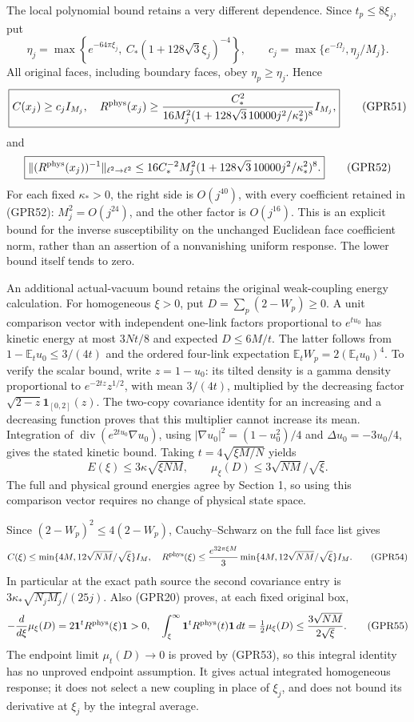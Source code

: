\documentclass[11pt]{article}
\begin{document}
The local polynomial bound retains a very different dependence. Since \(t_p\le8\xi_j\), put
\[
 \eta_j=\max\left\{e^{-64\pi\xi_j},\ C_*(1+128\sqrt3\xi_j)^{-4}\right\},
 \qquad c_j=\max\{e^{-\Omega_j},\eta_j/M_j\}.
 \tag{GPR50}
\]
All original faces, including boundary faces, obey \(\eta_p\ge\eta_j\). Hence
\[
 \boxed{C(x_j)\ge c_jI_{M_j},\quad
 R^{\rm phys}(x_j)\ge\frac{C_*^2}{16M_j^2(1+128\sqrt3\,10000j^2/\kappa_*^2)^8}I_{M_j},}
 \tag{GPR51}
\]
and
\[
 \boxed{\|(R^{\rm phys}(x_j))^{-1}\|_{\ell^2\to\ell^2}
 \le16C_*^{-2}M_j^2
       (1+128\sqrt3\,10000j^2/\kappa_*^2)^8.}
 \tag{GPR52}
\]
For each fixed \(\kappa_*>0\), the right side is \(O(j^{40})\), with every coefficient retained in (GPR52): \(M_j^2=O(j^{24})\), and the other factor is \(O(j^{16})\). This is an explicit bound for the inverse susceptibility on the unchanged Euclidean face coefficient norm, rather than an assertion of a nonvanishing uniform response. The lower bound itself tends to zero.

An additional actual-vacuum bound retains the original weak-coupling energy calculation. For homogeneous \(\xi>0\), put \(D=\sum_p(2-W_p)\ge0\). A unit comparison vector with independent one-link factors proportional to \(e^{t u_0}\) has kinetic energy at most \(3Nt/8\) and expected \(D\le6M/t\). The latter follows from \(1-\mathbb E_tu_0\le3/(4t)\) and the ordered four-link expectation \(\mathbb E_tW_p=2(\mathbb E_tu_0)^4\). To verify the scalar bound, write \(z=1-u_0\): its tilted density is a gamma density proportional to \(e^{-2tz}z^{1/2}\), with mean \(3/(4t)\), multiplied by the decreasing factor \(\sqrt{2-z}\mathbf1_{[0,2]}(z)\). The two-copy covariance identity for an increasing and a decreasing function proves that this multiplier cannot increase its mean. Integration of \(\operatorname{div}(e^{2tu_0}\nabla u_0)\), using \(|\nabla u_0|^2=(1-u_0^2)/4\) and \(\Delta u_0=-3u_0/4\), gives the stated kinetic bound. Taking \(t=4\sqrt{\xi M/N}\) yields
\[
 E(\xi)\le3\kappa\sqrt{\xi NM},\qquad
 \mu_\xi(D)\le3\sqrt{NM}/\sqrt\xi.
 \tag{GPR53}
\]
The full and physical ground energies agree by Section 1, so using this comparison vector requires no change of physical state space.

Since \((2-W_p)^2\le4(2-W_p)\), Cauchy–Schwarz on the full face list gives
\[
 C(\xi)\le\min\{4M,12\sqrt{NM}/\sqrt\xi\}I_M,
 \quad
 R^{\rm phys}(\xi)\le\frac{e^{32\pi\xi M}}3
          \min\{4M,12\sqrt{NM}/\sqrt\xi\}I_M.
 \tag{GPR54}
\]
In particular at the exact path source the second covariance entry is \(3\kappa_*\sqrt{N_jM_j}/(25j)\). Also (GPR20) proves, at each fixed original box,
\[
 -\frac d{d\xi}\mu_\xi(D)=2\mathbf1^tR^{\rm phys}(\xi)\mathbf1>0,
 \quad
 \int_{\xi}^{\infty}\mathbf1^tR^{\rm phys}(t)\mathbf1\,dt
 =\tfrac12\mu_\xi(D)\le\frac{3\sqrt{NM}}{2\sqrt\xi}.
 \tag{GPR55}
\]
The endpoint limit \(\mu_t(D)\to0\) is proved by (GPR53), so this integral identity has no unproved endpoint assumption. It gives actual integrated homogeneous response; it does not select a new coupling in place of \(\xi_j\), and does not bound its derivative at \(\xi_j\) by the integral average.
\end{document}
